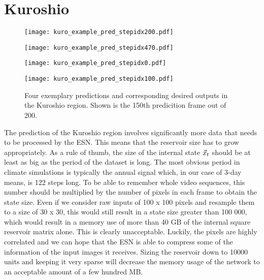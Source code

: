 \newpage
\section{Kuroshio}%
\label{sec:res_kuroshio}
\begin{figure}
  \begin{minipage}[b]{0.5\linewidth}
    \centering
    \texttt{[image: kuro\_example\_pred\_stepidx200.pdf]}
  \end{minipage}%
  \begin{minipage}[b]{0.5\linewidth}
    \centering
    \texttt{[image: kuro\_example\_pred\_stepidx470.pdf]}
  \end{minipage} 
  \begin{minipage}[b]{0.5\linewidth}
    \centering
    \texttt{[image: kuro\_example\_pred\_stepidx0.pdf]} 
  \end{minipage}%
  \begin{minipage}[b]{0.5\linewidth}
    \centering
    \texttt{[image: kuro\_example\_pred\_stepidx100.pdf]}
  \end{minipage} 
  \caption{Four exemplary predictions and corresponding desired outputs in the
    Kuroshio region. Shown is the 150th predicition frame out of 200.}
  \label{fig:kuro_pred_examples} 
\end{figure}


The prediction of the Kuroshio region involves significantly more data that
needs to be processed by the ESN. This means that the reservoir size has to
grow appropriately.  As a rule of thumb, the size of the internal state
$\vec{x}_t$ should be at least as big as the period of the dataset is long. The
most obvious period in climate simulations is typically the annual signal
which, in our case of 3-day means, is 122 steps long. To be able to remember
whole video sequences, this number should be multiplied by the number of pixels
in each frame to obtain the state size. Even if we consider raw inputs of 100 x 100
pixels and resample them to a size of 30 x 30, this would still result in a
state size greater than 100 000, which would result in a memory use of more
than 40 GB of the internal square reservoir matrix alone. This is clearly
unacceptable. Luckily, the pixels are highly correlated and we can hope that
the ESN is able to compress some of the information of the input images it
receives. Sizing the reservoir down to 10000 units and keeping it very sparse
will decrease the memory usage of the network to an acceptable amount of a few
hundred MB.

